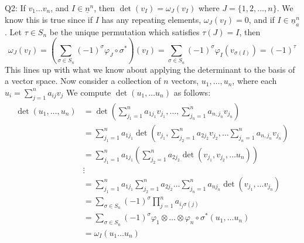 \documentclass[letterpaper]{article}
\begin{document}
\noindent Q2: If $v_1\dots v_n$, and $I\in \underline{n}^n$, then $\det(v_I) = \omega_J(v_I)$ where $J=\{1,2,\dots , n\}$. We know this is true since if $I$ has any repeating elements, $\omega_J(v_I)=0$, and if $I \in \underline{n}_a^n$. Let $\tau\in S_n$ be the unique permutation which satisfies $\tau(J)=I$, 
then $$\omega_J(v_I) = (\sum_{\sigma\in S_n} (-1)^{\sigma} \varphi_{J}\circ \sigma^{*})(v_I) = \sum_{\sigma \in S_n} (-1)^{\sigma} \varphi_I (v_{\sigma(I)} ) = (-1)^{\tau}$$
This lines up with what we know about applying the determinant to the basis of a vector space. Now  consider a collection of $n$ vectors, $u_1,\dots, u_n $, where each $u_i = \sum_{j=1}^n a_{ij} v_j$
We compute $\det(u_1,\dots u_n)$ as follows: 
\begin{align*}
    \det(u_1, \dots , u_n)  & = \det(\sum_{j_1=1}^n a_{1 j_1} v_{j_1},\dots, \sum_{j_n=1}^n a_{n,j_n}v_{j_n})
    \\ & = \sum_{j_1=1}^n a_{1j_1} \det(v_{j_1}, \sum_{j_2=1}^n a_{2 j_2}v_{j_2} , \dots \sum_{j_n=1}^n a_{n,j_n}v_{j_n})
    \\ & = \sum_{j_1=1}^n a_{1j_1} (\sum_{j_2=1}^n a_{2 j_2} \det(v_{j_1},v_{j_2}, \dots u_n))
    \\ & \vdots 
    \\ & = \sum_{j_1 =1}^n a_{1j_1}\sum_{j_2=1}^n a_{2j_2} \dots \sum_{j_n=1}^n a_{nj_n} \det(v_{j_1},\dots v_{j_n})
    \\ & = \sum_{\sigma \in S_n} (-1)^{\sigma} \prod_{j=1}^n a_{i_j \sigma(j)}
    \\ & = \sum_{\sigma \in S_n} (-1)^{\sigma} \varphi_1\otimes \dots \otimes \varphi_n \circ \sigma^{*} ( u_1, \dots u_n)
    \\ & = \omega_I(u_1\dots u_n)
\end{align*}
\end{document}
